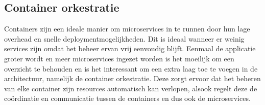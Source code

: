 \subsection{Container orkestratie}
Containers zijn een ideale manier om microservices in te runnen door hun lage overhead en snelle deploymentmogelijkheden\autocite{Jawarneh2019}. Dit is ideaal wanneer er weinig services zijn omdat het beheer ervan vrij eenvoudig blijft. Eenmaal de applicatie groter wordt en meer microservices ingezet worden is het moeilijk om een overzicht te behouden en is het interessant om een extra laag toe te voegen in de architectuur, namelijk de container orkestratie. Deze zorgt ervoor dat het beheren van elke container zijn resources automatisch kan verlopen, alsook regelt deze de coördinatie en communicatie tussen de containers en dus ook de microservices\autocite{Liu2020}. 
%
%
%
%


